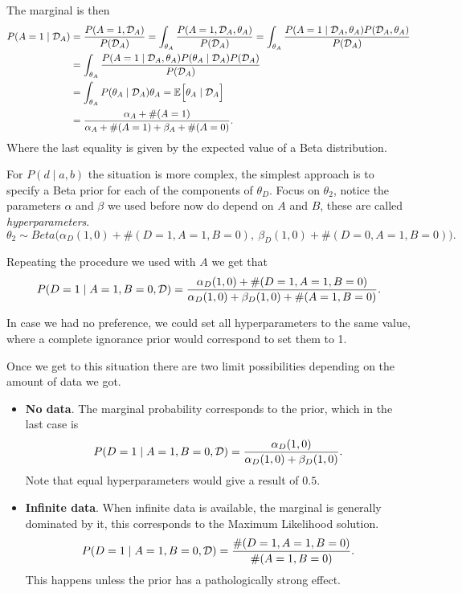 The marginal is then
\[
  \begin{aligned}
    P(A = 1 \mid \mathcal{D}_{A})
    &= \frac{P(A = 1, \mathcal{D}_{A})}{P(\mathcal{D}_{A})} = \int_{\theta_{A}}  \frac{P(A = 1, \mathcal{D}_{A}, \theta_{A})}{P(\mathcal{D}_{A})} =  \int_{\theta_{A}}  \frac{P(A = 1 \mid \mathcal{D}_{A}, \theta_{A}) P(\mathcal{D}_{A}, \theta_{A})}{P(\mathcal{D}_{A})} \\
    &=  \int_{\theta_{A}}  \frac{P(A = 1 \mid \mathcal{D}_{A}, \theta_{A}) P(\theta_{A} \mid \mathcal{D}_{A})P(\mathcal{D}_{A})}{P(\mathcal{D}_{A})} \\
    &= \int_{\theta_{A}}P(\theta_{A}\mid \mathcal{D}_{A})\theta_{A} = \mathbb{E}_{}\Big[\theta_{A} \mid \mathcal{D}_{A}\Big] \\
    &= \frac{\alpha_{A} + \#(A= 1)}{\alpha_{A} + \#(A=1) + \beta_{A} + \#(A=0)}.
  \end{aligned}
\]
Where the last equality is given by the expected value of a Beta distribution.

For \(P(d \mid a ,b)\) the situation is more complex, the simplest approach
is to specify a Beta prior for each of the components of \(\theta_{D}\).
Focus on \(\theta_{2}\), notice the parameters \(\alpha\)
and \(\beta\) we used before now do depend on \(A\) and \(B\), these
are called \emph{hyperparameters}.
\[
  \theta_{2} \sim Beta\Big(\alpha_{D}(1,0) + \#(D = 1, A = 1, B = 0), \ \beta_{D}(1,0) + \#(D = 0, A = 1, B = 0)\Big).
\]

Repeating the procedure we used with \(A\) we get that
\[
  P(D = 1 \mid A = 1, B = 0, \mathcal{D}) = \frac{\alpha_{D}(1,0) + \#(D = 1, A = 1, B = 0)}{\alpha_{D}(1,0) + \beta_{D}(1,0) + \#(A=1, B = 0)}.
\]

In case we had no preference, we could set all hyperparameters to the same
value, where a complete ignorance prior would correspond to set them to 1.

Once we get to this situation there are two limit possibilities depending on the amount of data we got.
\begin{itemize}
  \item \textbf{No data}. The marginal probability corresponds to the prior, which
in the last case is
    \[
    P(D = 1 \mid A = 1, B = 0, \mathcal{D}) = \frac{\alpha_{D}(1,0)}{\alpha_{D}(1,0) + \beta_{D}(1,0)}.
    \]
    Note that equal hyperparameters would give a result of \(0.5\).\newline
   
  \item \textbf{Infinite data}. When infinite data is available, the marginal is generally dominated by it,
    this corresponds to the Maximum Likelihood solution.
    \[
    P(D = 1 \mid A = 1, B = 0, \mathcal{D}) = \frac{\#(D = 1, A = 1 , B = 0)}{\#(A = 1, B = 0)}.
    \]
    This happens unless the prior has a pathologically strong effect.
\end{itemize}

